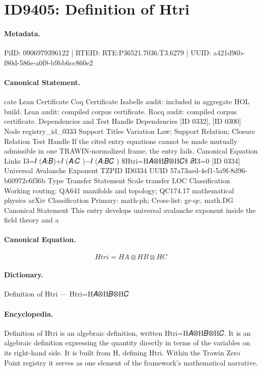 \section*{ID9405: Definition of Htri}
\paragraph{Metadata.}
PiID: 0906979396122 | RTEID: RTE:P36521.7036:T3.6279 | UUID: a421d96b-f80d-586e-a0f8-b9bb6cc860e2

\paragraph{Canonical Statement.}
cate Lean Certificate Coq Certificate Isabelle audit: included in aggregate HOL build. Lean audit: compiled corpus certificate. Rocq audit: compiled corpus certificate. Dependencies and Test Handle Dependencies [ID 0332], [ID 0300] Node registry\_id\_0333 Support Titles Variation Law; Support Relation; Closure Relation Test Handle If the cited entry equations cannot be made mutually admissible in one TRAWIN-normalized frame, the entry fails. Canonical Equation Links I3=𝐼 (𝐴:𝐵)+𝐼 (𝐴:𝐶 )−𝐼 (𝐴:𝐵𝐶 ) \$Htri=H𝐴⊗H𝐵⊗H𝐶\$ 𝜕I3=0 [ID 0334] Universal Avalanche Exponent TZPID ID0334 UUID 57a73aed-4ef1-5a9f-8d96-b60972c6f36b Type Transfer Statement Scale transfer LOC Classification Working routing: QA641 manifolds and topology; QC174.17 mathematical physics arXiv Classification Primary: math-ph; Cross-list: gr-qc, math.DG Canonical Statement This entry develops universal avalanche exponent inside the field theory and a

\paragraph{Canonical Equation.}
\[
Htri=H𝐴⊗H𝐵⊗H𝐶
\]

\paragraph{Dictionary.}
Definition of Htri — Htri=H𝐴⊗H𝐵⊗H𝐶

\paragraph{Encyclopedia.}
Definition of Htri is an algebraic definition, written Htri=H𝐴⊗H𝐵⊗H𝐶. It is an algebraic definition expressing the quantity directly in terms of the variables on its right-hand side. It is built from H, defining Htri. Within the Trawin Zero Point registry it serves as one element of the framework's mathematical narrative.
